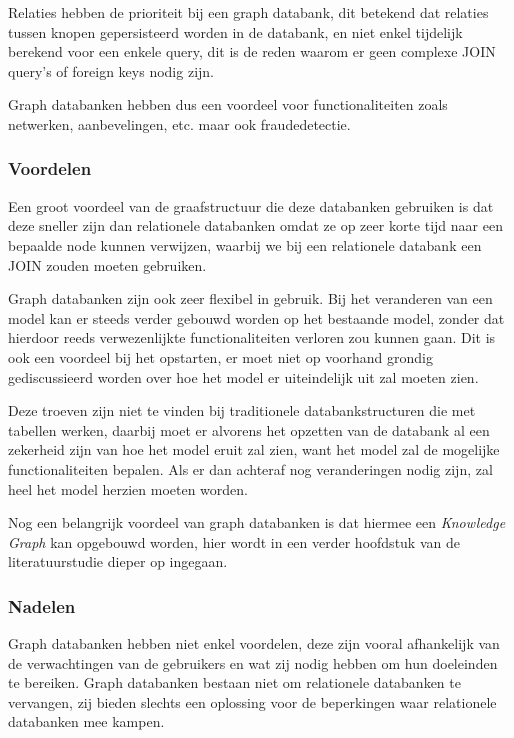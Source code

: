 Relaties hebben de prioriteit bij een graph databank, dit betekend dat relaties tussen knopen gepersisteerd worden in de databank, en niet enkel tijdelijk berekend voor een enkele query, dit is de reden waarom er geen complexe JOIN query's of foreign keys nodig zijn.

Graph databanken hebben dus een voordeel voor functionaliteiten zoals netwerken, aanbevelingen, etc. maar ook fraudedetectie. 

\subsubsection{Voordelen}
\label{subsec:Voordelen Graph}

Een groot voordeel van de graafstructuur die deze databanken gebruiken is dat deze sneller zijn dan relationele databanken omdat ze op zeer korte tijd naar een bepaalde node kunnen verwijzen, waarbij we bij een relationele databank een JOIN zouden moeten gebruiken. 

Graph databanken zijn ook zeer flexibel in gebruik. Bij het veranderen van een model kan er steeds verder gebouwd worden op het bestaande model, zonder dat hierdoor reeds verwezenlijkte functionaliteiten verloren zou kunnen gaan.
Dit is ook een voordeel bij het opstarten, er moet niet op voorhand grondig gediscussieerd worden over hoe het model er uiteindelijk uit zal moeten zien.

Deze troeven zijn niet te vinden bij traditionele databankstructuren die met tabellen werken, daarbij moet er alvorens het opzetten van de databank al een zekerheid zijn van hoe het model eruit zal zien, want het model zal de mogelijke functionaliteiten bepalen. Als er dan achteraf nog veranderingen nodig zijn, zal heel het model herzien moeten worden.

Nog een belangrijk voordeel van graph databanken is dat hiermee een \textit{Knowledge Graph} kan opgebouwd worden, hier wordt in een verder hoofdstuk van de literatuurstudie dieper op ingegaan.

\subsubsection{Nadelen}
\label{subsec: Nadelen Graph}

Graph databanken hebben niet enkel voordelen, deze zijn vooral afhankelijk van de verwachtingen van de gebruikers en wat zij nodig hebben om hun doeleinden te bereiken. Graph databanken bestaan niet om relationele databanken te vervangen, zij bieden slechts een oplossing voor de beperkingen waar relationele databanken mee kampen.


